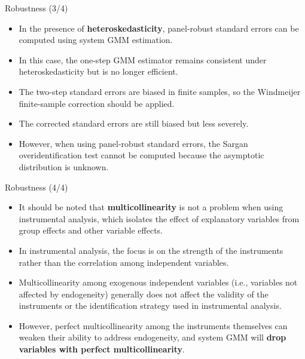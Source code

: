 \documentclass[color=usenames,dvipsnames]{beamer}
\begin{document}
\begin{frame}{Robustness (3/4)}
    \begin{itemize}
        \item In the presence of \textbf{heteroskedasticity}, panel-robust standard errors can be computed using system GMM estimation. 

        \item In this case, the one-step GMM estimator remains consistent under heteroskedasticity but is no longer efficient.

        \item The two-step standard errors are biased in finite samples, so the Windmeijer finite-sample correction should be applied.

        \item The corrected standard errors are still biased but less severely.

        \item However, when using panel-robust standard errors, the Sargan overidentification test cannot be computed because the asymptotic distribution is unknown.
        
    \end{itemize}
\end{frame}

\begin{frame}{Robustness (4/4)}
    \begin{itemize}
        \item It should be noted that \textbf{multicollinearity} is not a problem when using instrumental analysis, which isolates the effect of explanatory variables from group effects and other variable effects. 

        \item In instrumental analysis, the focus is on the strength of the instruments rather than the correlation among independent variables.

        \item Multicollinearity among exogenous independent variables (i.e., variables not affected by endogeneity) generally does not affect the validity of the instruments or the identification strategy used in instrumental analysis.

        \item However, perfect multicollinearity among the instruments themselves can weaken their ability to address endogeneity, and system GMM will \textbf{drop variables with perfect multicollinearity}.
        
    \end{itemize}
\end{frame}
\end{document}
